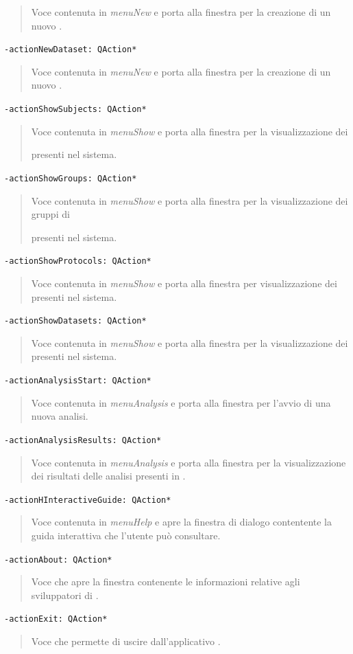 \begin{quote}
\color{black} Voce contenuta in \emph{menuNew} e porta alla finestra per la creazione di un nuovo \protocol{}.
\end{quote}
\color{teal}\verb!-actionNewDataset: QAction*!
\begin{quote}
\color{black} Voce contenuta in \emph{menuNew} e porta alla finestra per la creazione di un nuovo \dataset{}.
\end{quote}
\color{teal}\verb!-actionShowSubjects: QAction*!
\begin{quote}
\color{black} Voce contenuta in \emph{menuShow} e porta alla finestra per la visualizzazione dei \subject{} presenti nel sistema.
\end{quote}
\color{teal}\verb!-actionShowGroups: QAction*!
\begin{quote}
\color{black} Voce contenuta in \emph{menuShow} e porta alla finestra per la visualizzazione dei gruppi di \subject{} presenti nel sistema.
\end{quote}
\color{teal}\verb!-actionShowProtocols: QAction*!
\begin{quote}
\color{black} Voce contenuta in \emph{menuShow} e porta alla finestra per visualizzazione dei \protocol{} presenti nel sistema.
\end{quote}
\color{teal}\verb!-actionShowDatasets: QAction*!
\begin{quote}
\color{black} Voce contenuta in \emph{menuShow} e porta alla finestra per la visualizzazione dei \dataset{} presenti nel sistema.
\end{quote}
\color{teal}\verb!-actionAnalysisStart: QAction*!
\begin{quote}
\color{black} Voce contenuta in \emph{menuAnalysis} e porta alla finestra per l'avvio di una nuova analisi.
\end{quote}
\color{teal}\verb!-actionAnalysisResults: QAction*!
\begin{quote}
\color{black} Voce contenuta in \emph{menuAnalysis} e porta alla finestra per la visualizzazione dei risultati delle analisi presenti in \project{}.
\end{quote}
\color{teal}\verb!-actionHInteractiveGuide: QAction*!
\begin{quote}
\color{black} Voce contenuta in \emph{menuHelp} e apre la finestra di dialogo contentente la guida interattiva che l'utente può consultare.
\end{quote}
\color{teal}\verb!-actionAbout: QAction*!
\begin{quote}
\color{black} Voce che apre la finestra contenente le informazioni relative agli sviluppatori di \project{}.
\end{quote}
\color{teal}\verb!-actionExit: QAction*!
\begin{quote}
\color{black} Voce che permette di uscire dall'applicativo \project{}.
\end{quote}
